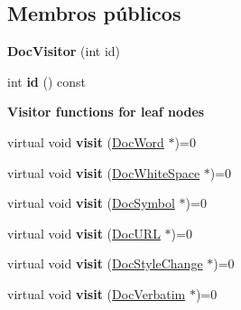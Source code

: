 \subsection*{Membros públicos}
\begin{DoxyCompactItemize}
\item 
\hypertarget{class_doc_visitor_a5788c8cf69f4477289a24661c5aba524}{{\bfseries Doc\-Visitor} (int id)}\label{class_doc_visitor_a5788c8cf69f4477289a24661c5aba524}

\item 
\hypertarget{class_doc_visitor_ae0c063cfb2479f614be43b9d2f92ba63}{int {\bfseries id} () const }\label{class_doc_visitor_ae0c063cfb2479f614be43b9d2f92ba63}

\end{DoxyCompactItemize}
\begin{Indent}{\bf Visitor functions for leaf nodes}\par
\begin{DoxyCompactItemize}
\item 
\hypertarget{class_doc_visitor_a639366ff4da6bf52cc53be001393f27c}{virtual void {\bfseries visit} (\hyperlink{class_doc_word}{Doc\-Word} $\ast$)=0}\label{class_doc_visitor_a639366ff4da6bf52cc53be001393f27c}

\item 
\hypertarget{class_doc_visitor_a6d649b7088a4e64e0315b5b549e81934}{virtual void {\bfseries visit} (\hyperlink{class_doc_white_space}{Doc\-White\-Space} $\ast$)=0}\label{class_doc_visitor_a6d649b7088a4e64e0315b5b549e81934}

\item 
\hypertarget{class_doc_visitor_abb345e421d0f25f85511d98a1f87349c}{virtual void {\bfseries visit} (\hyperlink{class_doc_symbol}{Doc\-Symbol} $\ast$)=0}\label{class_doc_visitor_abb345e421d0f25f85511d98a1f87349c}

\item 
\hypertarget{class_doc_visitor_a68b8f4233e6c155f9eec7553ba34d6d7}{virtual void {\bfseries visit} (\hyperlink{class_doc_u_r_l}{Doc\-U\-R\-L} $\ast$)=0}\label{class_doc_visitor_a68b8f4233e6c155f9eec7553ba34d6d7}

\item 
\hypertarget{class_doc_visitor_a68406d6ebe2e4626061a718c612153f1}{virtual void {\bfseries visit} (\hyperlink{class_doc_style_change}{Doc\-Style\-Change} $\ast$)=0}\label{class_doc_visitor_a68406d6ebe2e4626061a718c612153f1}

\item 
\hypertarget{class_doc_visitor_af01472b7dc82ae2afa212a3823a4a357}{virtual void {\bfseries visit} (\hyperlink{class_doc_verbatim}{Doc\-Verbatim} $\ast$)=0}\label{class_doc_visitor_af01472b7dc82ae2afa212a3823a4a357}


\end{DoxyCompactItemize}
\end{Indent}
